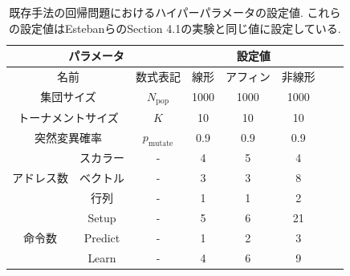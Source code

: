 \documentclass[11pt,oneside,openany,report]{jsbook}
\begin{document}
\begin{table}[tbp]
  \caption{既存手法の回帰問題におけるハイパーパラメータの設定値. これらの設定値はEstebanらのSection 4.1の実験と同じ値に設定している\cite{automl_zero}.}
  \label{table:exp:setting:conventional}
  \centering
  \begin{tabular}{|c|c|c|c|c|c|c|c|}
    \hline
    \multicolumn{3}{|c|}{パラメータ} & \multicolumn{3}{c|}{設定値} \\
    \hline
    \multicolumn{2}{|c|}{名前} & 数式表記 & 線形 & アフィン & 非線形 \\
    \hline
    \hline
    \multicolumn{2}{|c|}{集団サイズ} & $N_\mathrm{pop}$ & 1000 & 1000 & 1000 \\
    \hline
    \multicolumn{2}{|c|}{トーナメントサイズ} & $K$ & 10 & 10 & 10 \\
    \hline
    \multicolumn{2}{|c|}{突然変異確率} & $p_\mathrm{mutate}$ & 0.9 & 0.9 & 0.9 \\
    \hline
    \multirow{3}{*}{アドレス数}
    & スカラー & - & 4 & 5 & 4 \\
    & ベクトル & - & 3 & 3 & 8 \\
    & 行列 & - & 1 & 1 & 2 \\
    \hline
    \multirow{3}{*}{命令数}
    & Setup      & - & 5 & 6 & 21 \\
    & Predict    & - & 1 & 2 & 3 \\
    & Learn      & - & 4 & 6 & 9 \\
    \hline
  \end{tabular}
\end{table}
\end{document}
